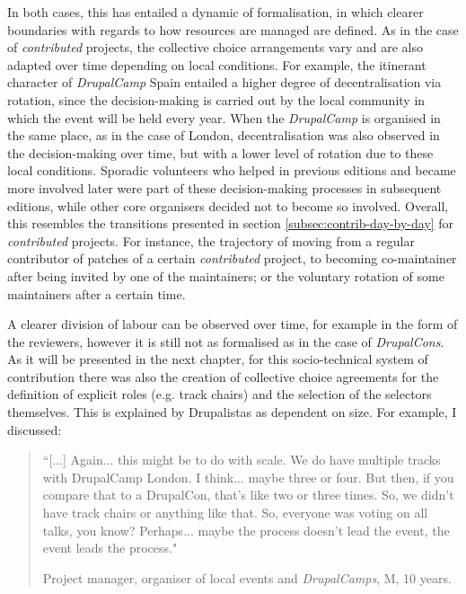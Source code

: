 In both cases, this has entailed a dynamic of formalisation, in which clearer boundaries with regards to how resources are managed are defined. As in the case of \textit{contributed} projects, the collective choice arrangements vary and are also adapted over time depending on local conditions. For example, the itinerant character of \textit{DrupalCamp} Spain entailed a higher degree of decentralisation via rotation, since the decision-making is carried out by the local community in which the event will be held every year. When the \textit{DrupalCamp} is organised in the same place, as in the case of London, decentralisation was also observed in the decision-making over time, but with a lower level of rotation due to these local conditions. Sporadic volunteers who helped in previous editions and became more involved later were part of these decision-making processes in subsequent editions, while other core organisers decided not to become so involved. Overall, this resembles the transitions presented in section \ref{subsec:contrib-day-by-day} for \textit{contributed} projects. For instance, the trajectory of moving from a regular contributor of patches of a certain \textit{contributed} project, to becoming co-maintainer after being invited by one of the maintainers; or the voluntary rotation of some maintainers after a certain time.

A clearer division of labour can be observed over time, for example in the form of the reviewers, however it is still not as formalised as in the case of \textit{DrupalCons}. As it will be presented in the next chapter, for this socio-technical system of contribution there was also the creation of collective choice agreements for the definition of explicit roles (e.g. track chairs) and the selection of the selectors themselves. This is explained by Drupalistas as dependent on size. For example, I discussed:

\begin{quotation}
``[...] Again... this might be to do with scale. We do have multiple tracks with DrupalCamp London. I think... maybe three or four. But then, if you compare that to a DrupalCon, that's like two or three times. So, we didn't have track chairs or anything like that. So, everyone was voting on all talks, you know? Perhaps... maybe the process doesn't lead the event, the event leads the process."

\begin{flushright}\footnotesize{Project manager, organiser of local events and \textit{DrupalCamps}, M, 10 years.}\end{flushright}
\end{quotation}

